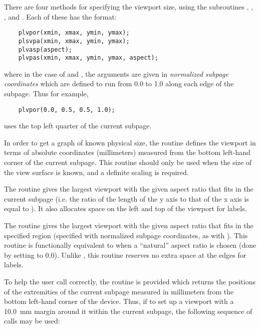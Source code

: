 There are four methods for specifying the viewport size, using the
subroutines , , , and .
Each of these has the format:

\begin{verbatim}
    plvpor(xmin, xmax, ymin, ymax);
    plsvpa(xmin, xmax, ymin, ymax);
    plvasp(aspect);
    plvpas(xmin, xmax, ymin, ymax, aspect);
\end{verbatim}

where in the case of  and , the arguments are given
in \emph{normalized subpage coordinates} which are defined to run from 0.0
to 1.0 along each edge of the subpage.  Thus for example,

\begin{verbatim}
    plvpor(0.0, 0.5, 0.5, 1.0);
\end{verbatim}

uses the top left quarter of the current subpage.

In order to get a graph of known physical size, the routine 
defines the viewport in terms of absolute coordinates (millimeters) measured
from the bottom left-hand corner of the current subpage.  This routine
should only be used when the size of the view surface is known, and a
definite scaling is required.

The routine  gives the largest viewport with the given aspect
ratio that fits in the current subpage (i.e. the ratio of the length of the
y axis to that of the x axis is equal to ).  It also allocates
space on the left and top of the viewport for labels.

The routine  gives the largest viewport with the given aspect
ratio that fits in the specified region (specified with normalized subpage
coordinates, as with ).  This routine is functionally
equivalent to  when a ``natural'' aspect ratio is chosen (done
by setting  to 0.0).  Unlike , this routine
reserves no extra space at the edges for labels.

To help the user call  correctly, the routine 
is provided which returns the positions of the extremities of the
current subpage measured in millimeters from the bottom left-hand corner
of the device.  Thus, if to set up a viewport with a 10.0~mm margin
around it within the current subpage, the following sequence of calls
may be used:

